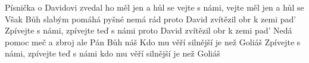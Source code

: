 \begin{TEXT}{Písnička o Davidovi}
\SLOKA {} zvedal     ho  \NL
{} měl jen  a hůl  se  \NL
{}vejte s námi, vejte   \NL
{} měl jen  a hůl  se  
\SLOKA Však Bůh slabým pomáhá pyšné nemá rád \NL
proto David zvítězil obr k zemi pad' \NL
Zpívejte s námi, zpívejte teď s námi \NL
proto David zvítězil obr k zemi pad' 
\SLOKA Nedá pomoc meč a zbroj ale Pán Bůh náš \NL
Kdo mu věří silnější je než Goliáš \NL
Zpívejte s námi, zpívejte teď s námi \NL
kdo mu věří silnější je než Goliáš \NL
\end{TEXT}
